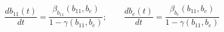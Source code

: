 \begin{equation}
\frac{d b_{11}(t)}{d t}=\frac{\beta_{b_{11}}(b_{11},b_e)}{1-\gamma(b_{11},b_e)}; \qquad
\frac{d b_{e}(t)}{d t}=\frac{\beta_{b_{e}}(b_{11},b_e)}{1-\gamma(b_{11},b_e)} \label{trajectory}
\end{equation}

